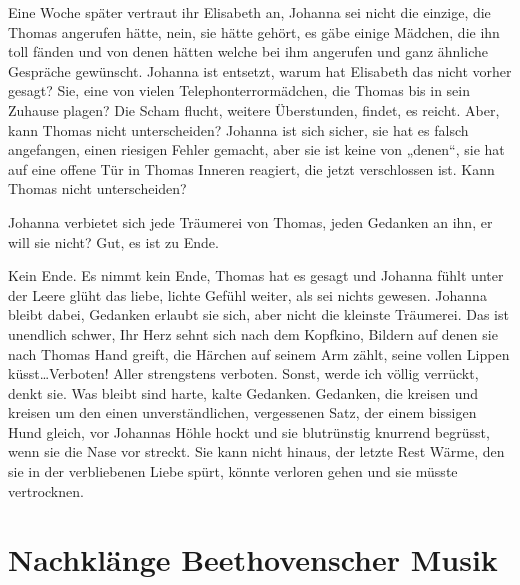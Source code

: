 \documentclass[10pt,a5paper]{book}
\begin{document}
Eine Woche später vertraut ihr Elisabeth an, Johanna sei nicht die einzige, die Thomas angerufen hätte, nein, sie hätte gehört, es gäbe einige Mädchen, die ihn toll fänden und von denen hätten welche bei ihm angerufen und ganz ähnliche Gespräche gewünscht. Johanna ist entsetzt, warum hat Elisabeth das nicht vorher gesagt? Sie, eine von vielen Telephonterrormädchen, die Thomas bis in sein Zuhause plagen? Die Scham flucht, weitere Überstunden, findet, es reicht. Aber, kann Thomas nicht unterscheiden? Johanna ist sich sicher, sie hat es falsch angefangen, einen riesigen Fehler gemacht, aber sie ist keine von „denen“, sie hat auf eine offene Tür in Thomas Inneren reagiert, die jetzt verschlossen ist. Kann Thomas nicht unterscheiden?

Johanna verbietet sich jede Träumerei von Thomas, jeden Gedanken an ihn, er will sie nicht? Gut, es ist zu Ende.

Kein Ende. Es nimmt kein Ende, Thomas hat es gesagt und Johanna fühlt unter der Leere glüht das liebe, lichte Gefühl weiter, als sei nichts gewesen. Johanna bleibt dabei, Gedanken erlaubt sie sich, aber nicht die kleinste Träumerei. Das ist unendlich schwer, Ihr Herz sehnt sich nach dem Kopfkino, Bildern auf denen sie nach Thomas Hand greift, die Härchen auf seinem Arm zählt, seine vollen Lippen küsst\dots Verboten! Aller strengstens verboten. Sonst, werde ich völlig verrückt, denkt sie.
Was bleibt sind harte, kalte Gedanken. Gedanken, die kreisen und kreisen um den einen unverständlichen, vergessenen Satz, der einem bissigen Hund gleich, vor Johannas Höhle hockt und sie blutrünstig knurrend begrüsst, wenn sie die Nase vor streckt. Sie kann nicht hinaus, der letzte Rest Wärme, den sie in der verbliebenen Liebe spürt, könnte verloren gehen und sie müsste vertrocknen.



\section*{Nachklänge Beethovenscher Musik}
\end{document}
